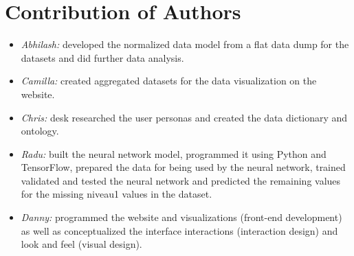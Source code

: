 \section{Contribution of Authors}

\begin{itemize}
\item \textit{Abhilash:} developed the normalized data model from a flat data dump for the datasets and did further data analysis. 
\item \textit{Camilla:} created aggregated datasets for the data visualization on the website.
\item \textit{Chris:} desk researched the user personas and created the data dictionary and ontology.
\item \textit{Radu:} built the neural network model, programmed it using Python and TensorFlow, prepared the data for being used by the neural network, trained validated and tested the neural network and predicted the remaining values for the missing niveau1 values in the dataset.
\item \textit{Danny:} programmed the website and visualizations (front-end development) as well as conceptualized the interface interactions (interaction design) and look and feel (visual design).
\end{itemize}